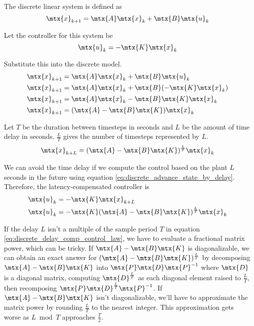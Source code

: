The discrete linear system is defined as
\begin{equation*}
  \mtx{x}_{k+1} = \mtx{A}\mtx{x}_k + \mtx{B}\mtx{u}_k
\end{equation*}

Let the controller for this system be
\begin{equation*}
  \mtx{u}_k = -\mtx{K}\mtx{x}_k
\end{equation*}

Substitute this into the discrete model.
\begin{align*}
  \mtx{x}_{k+1} &= \mtx{A}\mtx{x}_k + \mtx{B}\mtx{u}_k \\
  \mtx{x}_{k+1} &= \mtx{A}\mtx{x}_k + \mtx{B}(-\mtx{K}\mtx{x}_k) \\
  \mtx{x}_{k+1} &= \mtx{A}\mtx{x}_k - \mtx{B}\mtx{K}\mtx{x}_k \\
  \mtx{x}_{k+1} &= (\mtx{A} - \mtx{B}\mtx{K}) \mtx{x}_k
\end{align*}

Let $T$ be the duration between timesteps in seconds and $L$ be the amount of
time delay in seconds. $\frac{L}{T}$ gives the number of timesteps represented
by $L$.
\begin{equation}
  \mtx{x}_{k+L} = (\mtx{A} - \mtx{B}\mtx{K})^\frac{L}{T} \mtx{x}_k
    \label{eq:discrete_advance_state_by_delay}
\end{equation}

We can avoid the time delay if we compute the control based on the plant $L$
seconds in the future using equation \eqref{eq:discrete_advance_state_by_delay}.
Therefore, the latency-compensated controller is
\begin{align}
  \mtx{u}_k &= -\mtx{K}\mtx{x}_{k+L} \nonumber \\
  \mtx{u}_k &= -\mtx{K} (\mtx{A} - \mtx{B}\mtx{K})^\frac{L}{T} \mtx{x}_k
    \label{eq:discrete_delay_comp_control_law}
\end{align}

If the delay $L$ isn't a multiple of the sample period $T$ in equation
\eqref{eq:discrete_delay_comp_control_law}, we have to evaluate a fractional
matrix power, which can be tricky. If $\mtx{A} - \mtx{B}\mtx{K}$ is
diagonalizable, we can obtain an exact answer for
$(\mtx{A} - \mtx{B}\mtx{K})^\frac{L}{T}$ by decomposing
$\mtx{A} - \mtx{B}\mtx{K}$ into $\mtx{P}\mtx{D}\mtx{P}^{-1}$ where $\mtx{D}$ is
a diagonal matrix, computing $\mtx{D}^\frac{L}{T}$ as each diagonal element
raised to $\frac{L}{T}$, then recomposing
$\mtx{P}\mtx{D}^\frac{L}{T}\mtx{P}^{-1}$. If $\mtx{A} - \mtx{B}\mtx{K}$ isn't
diagonalizable, we'll have to approximate the matrix power by rounding
$\frac{L}{T}$ to the nearest integer. This approximation gets worse as
$L \bmod T$ approaches $\frac{T}{2}$.
